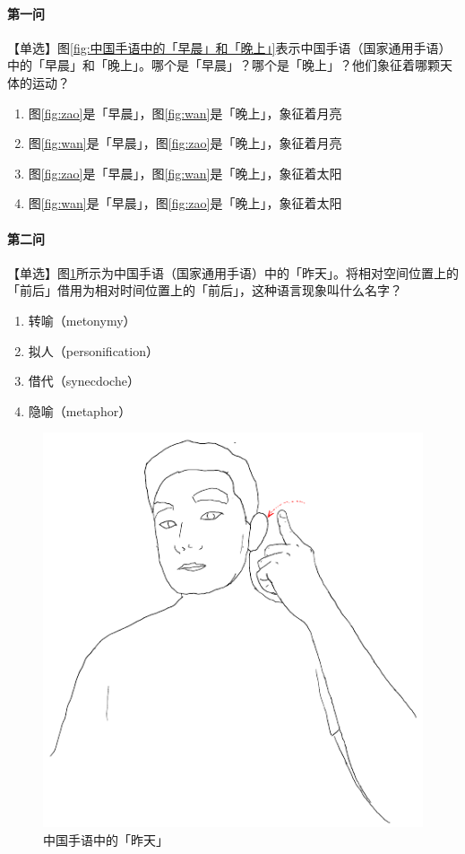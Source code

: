 \documentclass[12pt, a4paper, oneside]{ctexart}
\begin{document}
\paragraph{第一问}
【单选】图\ref{fig:中国手语中的「早晨」和「晚上」}表示中国手语（国家通用手语）中的「早晨」和「晚上」。哪个是「早晨」？哪个是「晚上」？他们象征着哪颗天体的运动？

\begin{enumerate}[label=\Alph*.]
    \item 图\ref{fig:zao}是「早晨」，图\ref{fig:wan}是「晚上」，象征着月亮
    \item 图\ref{fig:wan}是「早晨」，图\ref{fig:zao}是「晚上」，象征着月亮
    \item 图\ref{fig:zao}是「早晨」，图\ref{fig:wan}是「晚上」，象征着太阳
    \item 图\ref{fig:wan}是「早晨」，图\ref{fig:zao}是「晚上」，象征着太阳
\end{enumerate}

\newpage

\paragraph{第二问}
【单选】图\ref{fig:中国手语中的「昨天」}所示为中国手语（国家通用手语）中的「昨天」。将相对空间位置上的「前后」借用为相对时间位置上的「前后」，这种语言现象叫什么名字？
\begin{enumerate}[label=\Alph*.]
    \item 转喻（metonymy）
    \item 拟人（personification）
    \item 借代（synecdoche）
    \item 隐喻（metaphor）
\end{enumerate}

\begin{figure}[H]
    \centering
    \includegraphics[width=0.66\linewidth]{fig/zuotian.pdf}
    \centering
    \caption{中国手语中的「昨天」}
    \label{fig:中国手语中的「昨天」}
\end{figure}
\end{document}
